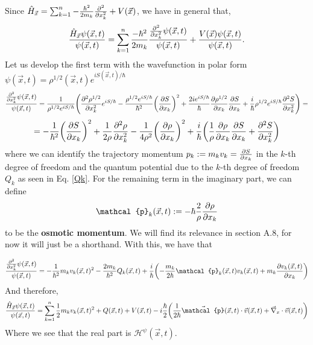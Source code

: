 \documentclass[11pt, a4paper]{article} %
\newcommand{\h}{\mathcal{H}}
\DeclareRobustCommand{\mybox}[2][gray!10]{%
\begin{tcolorbox}[   %
        left=0.2cm,
        right=0.2cm,
        top=0.15cm,
        bottom=0.15cm,
        colback=#1,
        colframe=#1,
        width=\dimexpr\textwidth\relax, 
        enlarge left by=0mm,
        boxsep=5pt,
        arc=0pt,outer arc=0pt,
        ]
        #2
\end{tcolorbox}
}
\begin{document}
\mybox{
Since $\hat{H}_{\vec{x}}=\sum_{k=1}^n-\frac{\hbar^2}{2m_k}\pdv[2]{}{x_k}+V(\vec{x})$, we have in general that,
\begin{equation}
\frac{\hat{H}_{\vec{x}}\psi(\vec{x},t)}{\psi(\vec{x},t)}=\sum_{k=1}^n \frac{-\hbar^2}{2m_k}\frac{\pdv[2]{}{x_k}\psi(\vec{x},t)}{\psi(\vec{x},t)}+\frac{V(\vec{x})\psi(\vec{x},t)}{\psi(\vec{x},t)}.
\end{equation}
Let us develop the first term with the wavefunction in polar form $\psi(\vec{x},t)=\rho^{1/2}(\vec{x},t)e^{iS(\vec{x},t)/\hbar}$
\begin{equation}
\frac{\pdv[2]{}{x_k}\psi(\vec{x},t)}{\psi(\vec{x},t)}=\frac{1}{\rho^{1/2}e^{iS/\hbar}}\qty(\pdv[2]{\rho^{1/2}}{x_k}e^{iS/\hbar}-\frac{\rho^{1/2}e^{iS/\hbar}}{\hbar^2}\qty(\pdv{S}{x_k})^2+\frac{2ie^{iS/\hbar}}{\hbar}\pdv{\rho^{1/2}}{x_k}\pdv{S}{x_k}+\frac{i}{\hbar}\rho^{1/2}e^{iS/\hbar}\pdv[2]{S}{x_k})=
\end{equation}
$$
=-\frac{1}{\hbar^2}\qty(\pdv{S}{x_k})^2+\frac{1}{2\rho}\pdv[2]{\rho}{x_k}-\frac{1}{4\rho^2}\qty(\pdv{\rho}{x_k})^2+\frac{i}{\hbar}\qty(\frac{1}{\rho}\pdv{\rho}{x_k}\pdv{S}{x_k}+\pdv[2]{S}{x_k})
$$
where we can identify the trajectory momentum $p_k:=m_kv_k=\pdv{S}{x_k}$ in the $k$-th degree of freedom and the quantum potential due to the $k$-th degree of freedom $Q_k$ as seen in Eq. \eqref{Qk}. For the remaining term in the imaginary part, we can define 
\begin{equation}
\mathcal{p}_k(\vec{x},t):=-\hbar\frac{2}{\rho}\pdv{\rho}{x_k}
\end{equation}
to be the {\bf osmotic momentum}. We will find its relevance in section A.8, for now it will just be a shorthand. With this, we have that
}\mybox{
\begin{equation}
\frac{\pdv[2]{}{x_k}\psi(\vec{x},t)}{\psi(\vec{x},t)}=-\frac{1}{\hbar^2}m_kv_k(\vec{x},t)^2-\frac{2m_k}{\hbar^2}Q_k(\vec{x},t)+\frac{i}{\hbar}\qty(-\frac{m_k}{2\hbar}\mathcal{p}_k(\vec{x},t)v_k(\vec{x},t)+m_k\pdv{v_k(\vec{x},t)}{x_k})
\end{equation}
And therefore,
\begin{equation}\label{weakH}
\frac{\hat{H}_{\vec{x}}\psi(\vec{x},t)}{\psi(\vec{x},t)}=\sum_{k=1}^n\frac{1}{2}m_kv_k(\vec{x},t)^2+Q(\vec{x},t)+V(\vec{x},t)-i\frac{\hbar}{2}\qty(\frac{1}{2\hbar}\vec{\mathcal{p}}(\vec{x},t)\cdot\vec{v}(\vec{x},t)+\vec{\nabla}_x\cdot \vec{v}(\vec{x},t))
\end{equation}
Where we see that the real part is $\h^\psi(\vec{x},t)$.


}
\end{document}
